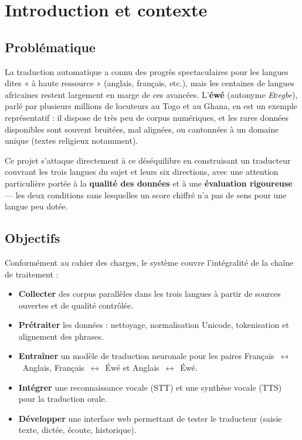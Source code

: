 \documentclass[11pt,a4paper]{article}
\begin{document}
\clearpage

{\hypersetup{linkcolor=primarydark}
 \renewcommand{\contentsname}{\sffamily\color{primarydark}Sommaire}
 \setcounter{tocdepth}{2}
 \begingroup{}\tableofcontents\endgroup}
\thispagestyle{fancy}
\clearpage

\section{Introduction et contexte}

\subsection{Problématique}
La traduction automatique a connu des progrès spectaculaires pour les langues dites
« à haute ressource » (anglais, français, etc.), mais les centaines de langues
africaines restent largement en marge de ces avancées. L'\textbf{éwé} (autonyme
\textit{Eʋegbe}), parlé par plusieurs millions de locuteurs au Togo et au Ghana, en est
un exemple représentatif : il dispose de très peu de corpus numériques, et les rares
données disponibles sont souvent bruitées, mal alignées, ou cantonnées à un domaine
unique (textes religieux notamment).

Ce projet s'attaque directement à ce déséquilibre en construisant un traducteur
couvrant les trois langues du sujet et leurs six directions, avec une attention
particulière portée à la \textbf{qualité des données} et à une \textbf{évaluation
rigoureuse} — les deux conditions sans lesquelles un score chiffré n'a pas de sens pour
une langue peu dotée.

\subsection{Objectifs}
Conformément au cahier des charges, le système couvre l'intégralité de la chaîne de
traitement :

\begin{itemize}[leftmargin=1.5em,itemsep=3pt]
  \item \textbf{Collecter} des corpus parallèles dans les trois langues à partir de
        sources ouvertes et de qualité contrôlée.
  \item \textbf{Prétraiter} les données : nettoyage, normalisation Unicode,
        tokenisation et alignement des phrases.
  \item \textbf{Entraîner} un modèle de traduction neuronale pour les paires
        Français~$\leftrightarrow$~Anglais, Français~$\leftrightarrow$~Éwé et
        Anglais~$\leftrightarrow$~Éwé.
  \item \textbf{Intégrer} une reconnaissance vocale (STT) et une synthèse vocale (TTS)
        pour la traduction orale.
  \item \textbf{Développer} une interface web permettant de tester le traducteur
        (saisie texte, dictée, écoute, historique).
\end{itemize}
\end{document}

